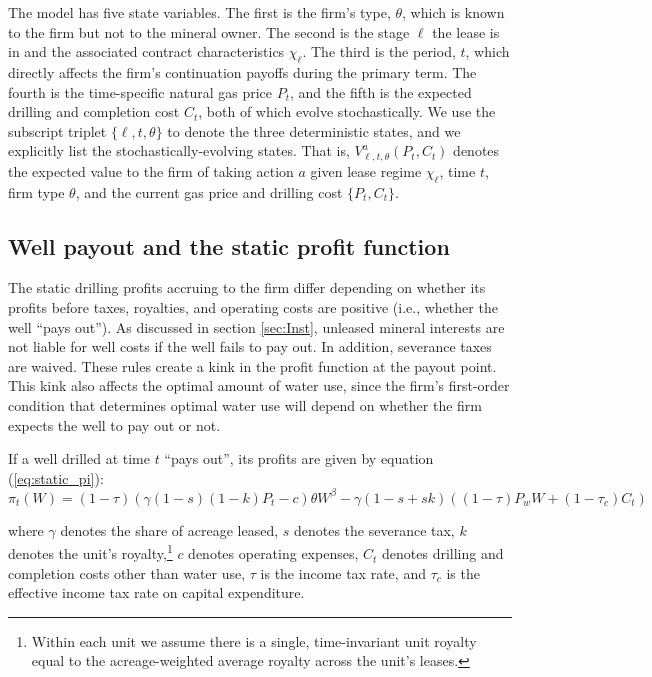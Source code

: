 \documentclass[12pt]{article}
\begin{document}
The model has five state variables. The first is the firm's type, $\theta$, which is known to the firm but not to the mineral owner. The second is the stage $\ell$ the lease is in and the associated contract characteristics $\chi_{\ell}$. The third is the period, $t$, which directly affects the firm's continuation payoffs during the primary term. The fourth is the time-specific natural gas price $P_t$, and the fifth is the expected drilling and completion cost $C_t$, both of which evolve stochastically. We use the subscript triplet $\{\ell,t,\theta\}$ to denote the three deterministic states, and we explicitly list the stochastically-evolving states. That is, $V^a_{\ell,t,\theta}(P_t,C_t)$ denotes the expected value to the firm of taking action $a$ given lease regime $\chi_{\ell}$, time $t$, firm type $\theta$, and the current gas price and drilling cost $\{P_t,C_t\}$.

\subsection{Well payout and the static profit function}

The static drilling profits accruing to the firm differ depending on whether its profits before taxes, royalties, and operating costs are positive (i.e., whether the well ``pays out''). As discussed in section \ref{sec:Inst}, unleased mineral interests are not liable for well costs if the well fails to pay out. In addition, severance taxes are waived. These rules create a kink in the profit function at the payout point. This kink also affects the optimal amount of water use, since the firm's first-order condition that determines optimal water use will depend on whether the firm expects the well to pay out or not.

If a well drilled at time $t$ ``pays out'', its profits are given by equation (\ref{eq:static_pi}):
\begin{equation}
\pi_t(W) = (1-\tau)(\gamma(1-s)(1-k)P_t-c)\theta W^{\beta} - \gamma(1-s+sk)((1-\tau) P_w W + (1-\tau_c) C_t) \label{eq:static_pi}
\end{equation}

\noindent where $\gamma$ denotes the share of acreage leased, $s$ denotes the severance tax, $k$ denotes the unit's royalty,\footnote{Within each unit we assume there is a single, time-invariant unit royalty equal to the acreage-weighted average royalty across the unit's leases.} $c$ denotes operating expenses, $C_t$ denotes drilling and completion costs other than water use, $\tau$ is the income tax rate, and $\tau_c$ is the effective income tax rate on capital expenditure.
\end{document}
